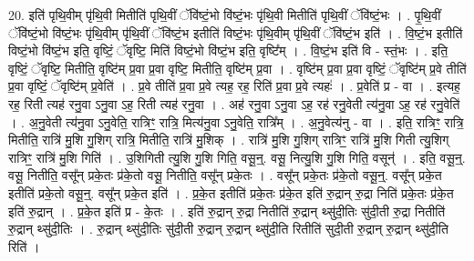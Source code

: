 \documentclass[17pt]{extarticle}
\begin{document}
20. इति॑ पृथि॒वीम् पृ॑थि॒वी मितीति॑ पृथि॒वीं ॅवि॑ष्टं॒भो वि॑ष्टं॒भः पृ॑थि॒वी मितीति॑ पृथि॒वीं ॅवि॑ष्टं॒भः । . पृ॒थि॒वीं ॅवि॑ष्टं॒भो वि॑ष्टं॒भः पृ॑थि॒वीम् पृ॑थि॒वीं ॅवि॑ष्टं॒भ इतीति॑ विष्टं॒भः पृ॑थि॒वीम् पृ॑थि॒वीं ॅवि॑ष्टं॒भ इति॑ । . वि॒ष्टं॒भ इतीति॑ विष्टं॒भो वि॑ष्टं॒भ इति॒ वृष्टिं॒ ॅवृष्टि॒ मिति॑ विष्टं॒भो वि॑ष्टं॒भ इति॒ वृष्टि᳚म् । . वि॒ष्टं॒भ इति॑ वि - स्तं॒भः । . इति॒ वृष्टिं॒ ॅवृष्टि॒ मितीति॒ वृष्टि॑म् प्र॒वा प्र॒वा वृष्टि॒ मितीति॒ वृष्टि॑म् प्र॒वा । . वृष्टि॑म् प्र॒वा प्र॒वा वृष्टिं॒ ॅवृष्टि॑म् प्र॒वे तीति॑ प्र॒वा वृष्टिं॒ ॅवृष्टि॑म् प्र॒वेति॑ । . प्र॒वे तीति॑ प्र॒वा प्र॒वे त्यह॒ रह॒ रिति॑ प्र॒वा प्र॒वे त्यहः॑ । . प्र॒वेति॑ प्र - वा । . इत्यह॒ रह॒ रिती त्यह॑ रनु॒वा ऽनु॒वा ऽह॒ रिती त्यह॑ रनु॒वा । . अह॑ रनु॒वा ऽनु॒वा ऽह॒ रह॑ रनु॒वेती त्य॑नु॒वा ऽह॒ रह॑ रनु॒वेति॑ । . अ॒नु॒वेती त्य॑नु॒वा ऽनु॒वेति॒ रात्रिꣳ॒॒ रात्रि॒ मित्य॑नु॒वा ऽनु॒वेति॒ रात्रि᳚म् । . अ॒नु॒वेत्य॑नु - वा । . इति॒ रात्रिꣳ॒॒ रात्रि॒ मितीति॒ रात्रि॑ मु॒शि गु॒शिग् रात्रि॒ मितीति॒ रात्रि॑ मु॒शिक् । . रात्रि॑ मु॒शि गु॒शिग् रात्रिꣳ॒॒ रात्रि॑ मु॒शि गिती त्यु॒शिग् रात्रिꣳ॒॒ रात्रि॑ मु॒शि गिति॑ । . उ॒शिगिती त्यु॒शि गु॒शि गिति॒ वसू॒न्॒. वसू॒ नित्यु॒शि गु॒शि गिति॒ वसून्॑ । . इति॒ वसू॒न्॒. वसू॒ नितीति॒ वसू᳚न् प्रके॒तः प्र॑के॒तो वसू॒ नितीति॒ वसू᳚न् प्रके॒तः । . वसू᳚न् प्रके॒तः प्र॑के॒तो वसू॒न्॒. वसू᳚न् प्रके॒त इतीति॑ प्रके॒तो वसू॒न्॒. वसू᳚न् प्रके॒त इति॑ । . प्र॒के॒त इतीति॑ प्रके॒तः प्र॑के॒त इति॑ रु॒द्रान् रु॒द्रा निति॑ प्रके॒तः प्र॑के॒त इति॑ रु॒द्रान् । . प्र॒के॒त इति॑ प्र - के॒तः । . इति॑ रु॒द्रान् रु॒द्रा नितीति॑ रु॒द्रान् थ्सु॑दी॒तिः सु॑दी॒ती रु॒द्रा नितीति॑ रु॒द्रान् थ्सु॑दी॒तिः । . रु॒द्रान् थ्सु॑दी॒तिः सु॑दी॒ती रु॒द्रान् रु॒द्रान् थ्सु॑दी॒ति रितीति॑ सुदी॒ती रु॒द्रान् रु॒द्रान् थ्सु॑दी॒ति रिति॑ । \newline
\end{document}
